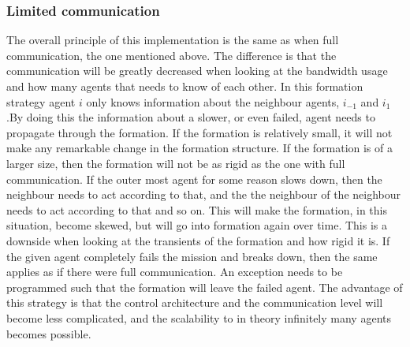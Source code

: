 \subsubsection{Limited communication}
The overall principle of this implementation is the same as when full communication, the one mentioned above. The difference is that the communication will be greatly decreased when looking at the bandwidth usage and how many agents that needs to know of each other. In this formation strategy agent $i$ only knows information about the neighbour agents, $i_{-1}$ and $i_{1}$.By doing this the information about a slower, or even failed, agent needs to propagate through the formation. If the formation is relatively small, it will not make any remarkable change in the formation structure. If the formation is of a larger size, then the formation will not be as rigid as the one with full communication. If the outer most agent for some reason slows down, then the neighbour needs to act according to that, and the the neighbour of the neighbour needs to act according to that and so on. This will make the formation, in this situation, become skewed, but will go into formation again over time. This is a downside when looking at the transients of the formation and how rigid it is. If the given agent completely fails the mission and breaks down, then the same applies as if there were full communication. An exception needs to be programmed such that the formation will leave the failed agent. The advantage of this strategy is that the control architecture and the communication level will become less complicated, and the scalability to in theory infinitely many agents becomes possible.

